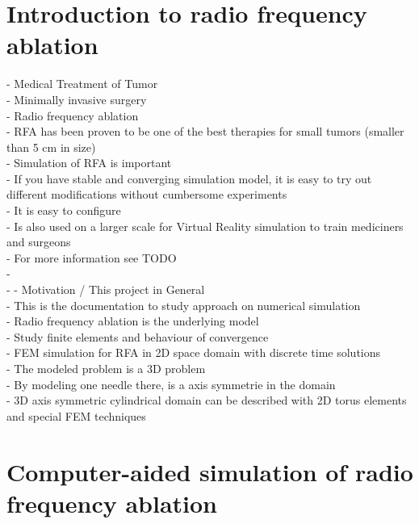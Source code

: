 \documentclass[parskip=half, titlepage=yes, 12pt, BCOR=12mm, DIV=calc]{scrartcl}
\begin{document}
\maketitle
\tableofcontents

\clearpage




\section{Introduction to radio frequency ablation}
- Medical Treatment of Tumor\\
- Minimally invasive surgery \\ 
- Radio frequency ablation\\
- RFA has been proven to be one of the best therapies for small tumors (smaller than 5 cm in size) \\
- Simulation of RFA is important \\
- If you have stable and converging simulation model, it is easy to try out different modifications without cumbersome experiments \\ 
- It is easy to configure \\
- Is also used on a larger scale for Virtual Reality simulation to train mediciners and surgeons \\
- For more information see TODO \\
- \\
- 
- Motivation / This project in General\\
- This is the documentation to study approach on numerical simulation \\
- Radio frequency ablation is the underlying model \\
- Study finite elements and behaviour of convergence \\
- FEM simulation for RFA in 2D space domain with discrete time solutions \\
- The modeled problem is a 3D problem \\
- By modeling one needle there, is a axis symmetrie in the domain \\
- 3D axis symmetric cylindrical domain can be described with 2D torus elements and special FEM techniques \\ 



\section{Computer-aided simulation of radio frequency ablation}
\end{document}
